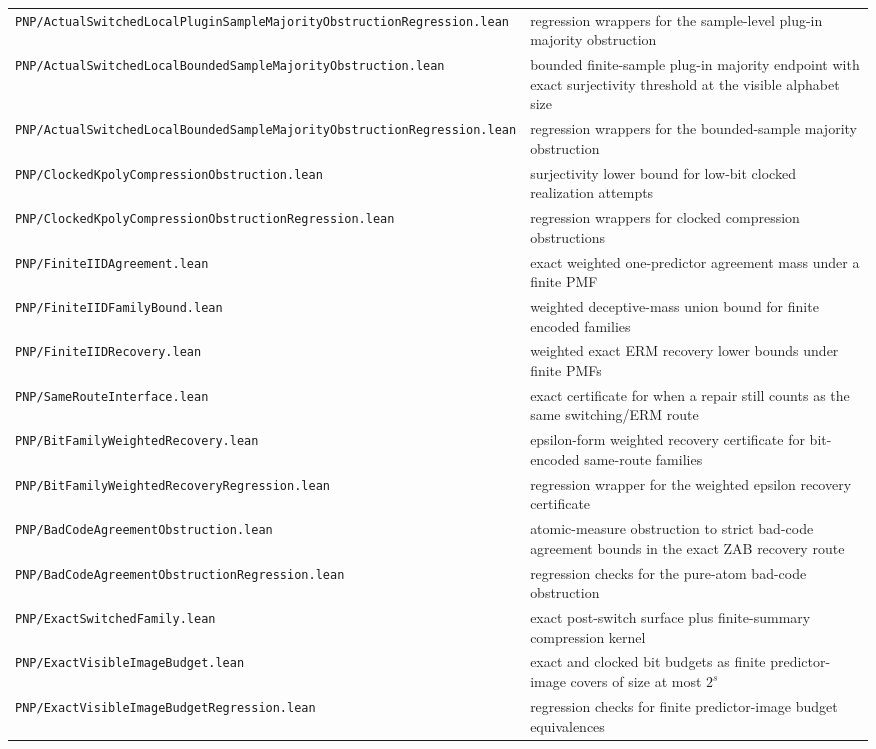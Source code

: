 \documentclass[11pt]{article}
\theoremstyle{remark}
\begin{document}
\begin{center}
\begin{tabular}{ll}
\texttt{PNP/ActualSwitchedLocalPluginSampleMajorityObstructionRegression.lean} & regression wrappers for the sample-level plug-in majority obstruction \\
\texttt{PNP/ActualSwitchedLocalBoundedSampleMajorityObstruction.lean} & bounded finite-sample plug-in majority endpoint with exact surjectivity threshold at the visible alphabet size \\
\texttt{PNP/ActualSwitchedLocalBoundedSampleMajorityObstructionRegression.lean} & regression wrappers for the bounded-sample majority obstruction \\
\texttt{PNP/ClockedKpolyCompressionObstruction.lean} & surjectivity lower bound for low-bit clocked realization attempts \\
\texttt{PNP/ClockedKpolyCompressionObstructionRegression.lean} & regression wrappers for clocked compression obstructions \\
\texttt{PNP/FiniteIIDAgreement.lean} & exact weighted one-predictor agreement mass under a finite PMF \\
\texttt{PNP/FiniteIIDFamilyBound.lean} & weighted deceptive-mass union bound for finite encoded families \\
\texttt{PNP/FiniteIIDRecovery.lean} & weighted exact ERM recovery lower bounds under finite PMFs \\
\texttt{PNP/SameRouteInterface.lean} & exact certificate for when a repair still counts as the same switching/ERM route \\
\texttt{PNP/BitFamilyWeightedRecovery.lean} & epsilon-form weighted recovery certificate for bit-encoded same-route families \\
\texttt{PNP/BitFamilyWeightedRecoveryRegression.lean} & regression wrapper for the weighted epsilon recovery certificate \\
\texttt{PNP/BadCodeAgreementObstruction.lean} & atomic-measure obstruction to strict bad-code agreement bounds in the exact ZAB recovery route \\
\texttt{PNP/BadCodeAgreementObstructionRegression.lean} & regression checks for the pure-atom bad-code obstruction \\
\texttt{PNP/ExactSwitchedFamily.lean} & exact post-switch surface plus finite-summary compression kernel \\
\texttt{PNP/ExactVisibleImageBudget.lean} & exact and clocked bit budgets as finite predictor-image covers of size at most \(2^s\) \\
\texttt{PNP/ExactVisibleImageBudgetRegression.lean} & regression checks for finite predictor-image budget equivalences \\

\end{tabular}
\end{center}
\end{document}
